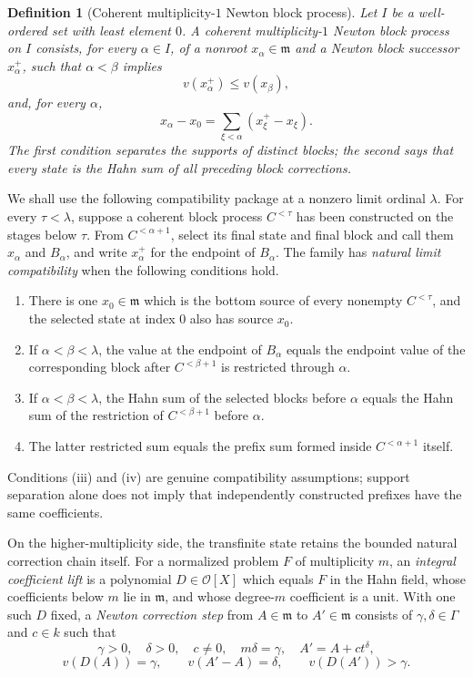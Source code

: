 \documentclass[11pt]{article}
\newcommand{\Val}{v}
\newcommand{\Ocal}{\mathcal O}
\theoremstyle{proofnote}
\newtheorem{definition}[theorem]{Definition}
\begin{document}
\begin{definition}[Coherent multiplicity-\(1\) Newton block process]
\label{def:coherent-one-block}
  Let \(I\) be a well-ordered set with least element \(0\).  A
  \emph{coherent multiplicity-\(1\) Newton block process} on \(I\) consists,
  for every \(\alpha\in I\), of a nonroot \(x_\alpha\in\mathfrak m\) and a
  Newton block successor \(x_\alpha^+\), such that \(\alpha<\beta\) implies
  \[
    v(x_\alpha^+)\le v(x_\beta),
  \]
  and, for every \(\alpha\),
  \[
    x_\alpha-x_0=\sum_{\xi<\alpha}(x_\xi^+-x_\xi).
    \tag{BC}\label{eq:block-coherence}
  \]
  The first condition separates the supports of distinct blocks; the second
  says that every state is the Hahn sum of all preceding block corrections.
\end{definition}

We shall use the following compatibility package at a nonzero limit ordinal
\(\lambda\).  For every \(\tau<\lambda\), suppose a coherent block process
\(C^{<\tau}\) has been constructed on the stages below \(\tau\).  From
\(C^{<\alpha+1}\), select its final state and final block and call
them \(x_\alpha\) and \(B_\alpha\), and write \(x_\alpha^+\) for the endpoint
of \(B_\alpha\).  The family has \emph{natural limit
compatibility} when the following conditions hold.
\begin{enumerate}[label=(\roman*)]
  \item There is one \(x_0\in\mathfrak m\) which is the bottom source of every
    nonempty \(C^{<\tau}\), and the selected state at index \(0\) also has
    source \(x_0\).
  \item If \(\alpha<\beta<\lambda\), the value at the endpoint of
    \(B_\alpha\) equals the endpoint value of the corresponding block after
    \(C^{<\beta+1}\) is restricted through \(\alpha\).
  \item If \(\alpha<\beta<\lambda\), the Hahn sum of the selected blocks
    before \(\alpha\) equals the Hahn sum of the restriction of
    \(C^{<\beta+1}\) before \(\alpha\).
  \item The latter restricted sum equals the prefix sum formed inside
    \(C^{<\alpha+1}\) itself.
\end{enumerate}
Conditions (iii) and (iv) are genuine compatibility assumptions; support
separation alone does not imply that independently constructed prefixes have
the same coefficients.

On the higher-multiplicity side, the transfinite state retains the bounded
natural correction chain itself.  For a normalized problem \(F\) of
multiplicity \(m\), an \emph{integral coefficient lift} is a polynomial
\(D\in\Ocal[X]\) which equals \(F\) in the Hahn field, whose coefficients
below \(m\) lie in \(\mathfrak m\), and whose degree-\(m\) coefficient is a
unit.  With one such \(D\) fixed, a \emph{Newton correction step} from
\(A\in\mathfrak m\) to \(A'\in\mathfrak m\) consists of
\(\gamma,\delta\in\Gamma\) and \(c\in k\) such that
\[
  \gamma>0,\quad\delta>0,\quad c\ne0,\quad m\delta=\gamma,
  \quad A'=A+ct^\delta,
\]
\[
  \Val(D(A))=\gamma,\qquad
  \Val(A'-A)=\delta,\qquad
  \Val(D(A'))>\gamma.
  \tag{NS}\label{eq:newton-step-data}
\]
\end{document}
